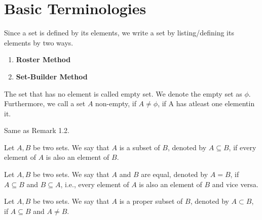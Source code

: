 \documentclass[11pt]{scrartcl}
\begin{document}
    \section{Basic Terminologies}
    Since a set is defined by its elements, we write a set by listing/defining its elements by two ways.
    \begin{enumerate}
        \item \textbf{Roster Method}
        \item \textbf{Set-Builder Method}
    \end{enumerate}
    \begin{definition}
        The set that has no element is called empty set. We denote the empty set as \(\phi\). Furthermore, we call a set \(A\) non-empty, if \(A \neq \phi\), if A has atleast one elementin it.
    \end{definition}
    \begin{remark}
        Same as Remark 1.2.
    \end{remark}
    \begin{definition}
        Let \(A, B\) be two sets. We say that \(A\) is a subset of \(B\), denoted by \(A \subseteq B\), if every element of \(A\) is also an element of \(B\).
    \end{definition}
    \begin{definition}
        Let \(A, B\) be two sets. We say that \(A\) and \(B\) are equal, denoted by \(A = B\), if \(A \subseteq B\) and \(B \subseteq A\), i.e., every element of \(A\) is also an element of \(B\) and vice versa.
    \end{definition}
    \begin{definition}
        Let \(A, B\) be two sets. We say that \(A\) is a proper subset of \(B\), denoted by \(A \subset B\), if \(A \subseteq B\) and \(A \neq B\).
    \end{definition}
\end{document}
